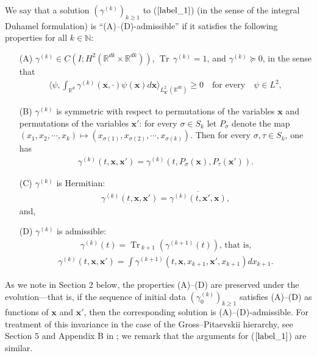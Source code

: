\documentclass[reqno]{amsart}
\numberwithin{equation}{section}
\theoremstyle{remark}
\DeclareMathOperator{\Tr}{Tr\,}
\begin{document}
We say that a solution $(\gamma^{(k)})_{k\geq 1}$ to ($\ref{label_1}$) (in the sense of the integral Duhamel formulation) is ``(A)--(D)-admissible'' if it satisfies the following properties for all $k\in\mathbb{N}$:
\begin{enumerate}
\item[(A)] $\gamma^{(k)}\in C(I;H^2(\mathbb{R}^{dk}\times \mathbb{R}^{dk}))$, $\Tr \gamma^{(k)}=1$, and $\gamma^{(k)}\succeq 0$, in the sense that 
\begin{align*}
\bigg\langle \psi,\int_{\mathbb{R}^d}\gamma^{(k)}({\mathbf x},\cdot)\psi(\mathbf{x})d{\mathbf x}\bigg\rangle_{L^2_{{\mathbf x}'}(\mathbb{R}^{dk})}\geq 0\quad \textrm{for every}\quad \psi\in L^2,
\end{align*}
\item[(B)] $\gamma^{(k)}$ is symmetric with respect to permutations of the variables ${\mathbf x}$ and permutations of the variables ${\mathbf x}'$: for every $\sigma\in S_k$ let $P_\sigma$ denote the map $(x_1,x_2,\cdots,x_k)\mapsto (x_{\sigma(1)},x_{\sigma(2)},\cdots,x_{\sigma(k)})$.  Then for every $\sigma,\tau\in S_k$, one has
\begin{align*}
\gamma^{(k)}(t,{\mathbf x},{\mathbf x}')=\gamma^{(k)}(t,P_\sigma(\mathbf{x}),P_\tau(\mathbf{x}')).
\end{align*}
\item[(C)] $\gamma^{(k)}$ is Hermitian:
\begin{align*}
\gamma^{(k)}(t,{\mathbf x},{\mathbf x}')=\overline{\gamma^{(k)}(t,{\mathbf x}',{\mathbf x})}, 
\end{align*}
and,
\item[(D)] $\gamma^{(k)}$ is admissible:
\begin{align*}
\gamma^{(k)}(t)=\Tr_{k+1}(\gamma^{(k+1)}(t)),\,\textrm{that is,}
\end{align*}
\begin{align*}\gamma^{(k)}(t,{\mathbf x},{\mathbf x}')=\int \gamma^{(k+1)}(t,{\mathbf x},x_{k+1},{\mathbf x}',x_{k+1})dx_{k+1}.
\end{align*}
\end{enumerate}

As we note in Section $2$ below, the properties (A)--(D) are preserved under the evolution---that is, if the sequence of initial data $(\gamma^{(k)}_0)_{k\geq 1}$ satisfies (A)--(D) as functions of ${\mathbf x}$ and ${\mathbf x'}$, then the corresponding solution is (A)--(D)-admissible.  For treatment of this invariance in the case of the Gross--Pitaevskii hierarchy, see Section $5$ and Appendix B in \cite{ChTa}; we remark that the arguments for ($\ref{label_1}$) are similar.
\end{document}
